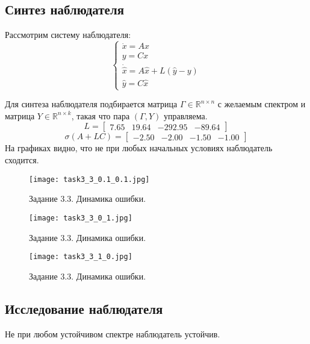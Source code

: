 \subsection{Синтез наблюдателя}
Рассмотрим систему наблюдателя:
\begin{equation}
    \begin{cases}
        \dot{x} = A x \\
        y = C x \\
        \dot{\hat{x}} = A \hat{x} + L(\hat{y} - y) \\
        \hat{y} = C \hat{x}
\end{cases} 
\end{equation}



Для синтеза наблюдателя подбирается матрица \(\Gamma \in \mathbb{R}^{n \times n}\) с желаемым спектром и матрица \(Y \in \mathbb{R}^{n \times k}\), такая что пара \((\Gamma, Y)\) управляема.
\[L = \begin{bmatrix}
    7.65 &  19.64 & -292.95 & -89.64
  \end{bmatrix}\]
  \[\sigma(A + LC) = \begin{bmatrix}
    -2.50 & -2.00 & -1.50 & -1.00
\end{bmatrix}\]
На графиках видно, что не при любых начальных условиях наблюдатель сходится.

\begin{figure}[]
        \centering
        \texttt{[image: task3\_3\_0.1\_0.1.jpg]}
        \caption{Задание 3.3. Динамика ошибки.}
        \label{fig:task3_3_0.1_0.1.jpg}
\end{figure}
\begin{figure}[]
        \centering
        \texttt{[image: task3\_3\_0\_1.jpg]}
        \caption{Задание 3.3. Динамика ошибки.}
        \label{fig:task3_3_0_1.jpg}
\end{figure}

\begin{figure}[]
        \centering
        \texttt{[image: task3\_3\_1\_0.jpg]}
        \caption{Задание 3.3. Динамика ошибки.}
        \label{fig:task3_3_1_0.jpg}
\end{figure}


\subsection{Исследование наблюдателя}
Не при любом устойчивом спектре наблюдатель устойчив. 


